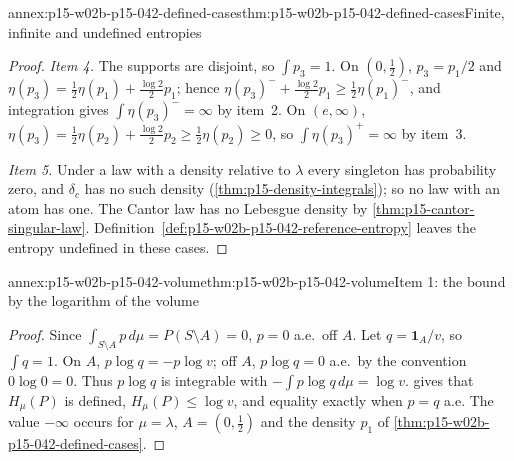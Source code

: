 \begin{annexitem}{annex:p15-w02b-p15-042-defined-cases}{thm:p15-w02b-p15-042-defined-cases}{Finite, infinite and undefined entropies}
\begin{proof}
\emph{Item 4.} The supports are disjoint, so \(\int p_3=1\). On
\((0,\tfrac12)\), \(p_3=p_1/2\) and
\(\eta(p_3)=\tfrac12\eta(p_1)+\tfrac{\log2}2p_1\); hence
\(\eta(p_3)^-+\tfrac{\log2}2p_1\geq\tfrac12\eta(p_1)^-\), and integration
gives \(\int\eta(p_3)^-=\infty\) by item~2. On \((e,\infty)\),
\(\eta(p_3)=\tfrac12\eta(p_2)+\tfrac{\log2}2p_2\geq\tfrac12\eta(p_2)\geq0\),
so \(\int\eta(p_3)^+=\infty\) by item~3.

\emph{Item 5.} Under a law with a density relative to \(\lambda\) every
singleton has probability zero, and \(\delta_c\) has no such density
(\cref{thm:p15-density-integrals}); so no law with an atom has one. The Cantor
law has no Lebesgue density by \cref{thm:p15-cantor-singular-law}.
Definition~\ref{def:p15-w02b-p15-042-reference-entropy} leaves the entropy
undefined in these cases.
\end{proof}
\end{annexitem}

\begin{annexitem}{annex:p15-w02b-p15-042-volume}{thm:p15-w02b-p15-042-volume}{Item 1: the bound by the logarithm of the volume}
\begin{proof}
Since \(\int_{S\setminus A}p\,d\mu=P(S\setminus A)=0\), \(p=0\) a.e.\ off
\(A\). Let \(q=\mathbf 1_A/v\), so \(\int q=1\). On \(A\),
\(p\log q=-p\log v\); off \(A\), \(p\log q=0\) a.e.\ by the convention
\(0\log0=0\). Thus \(p\log q\) is integrable with
\(-\int p\log q\,d\mu=\log v\).  gives that
\(H_\mu(P)\) is defined, \(H_\mu(P)\leq\log v\), and equality exactly when
\(p=q\) a.e. The value \(-\infty\) occurs for
\(\mu=\lambda\), \(A=(0,\tfrac12)\) and the density \(p_1\) of
\cref{thm:p15-w02b-p15-042-defined-cases}.
\end{proof}
\end{annexitem}

